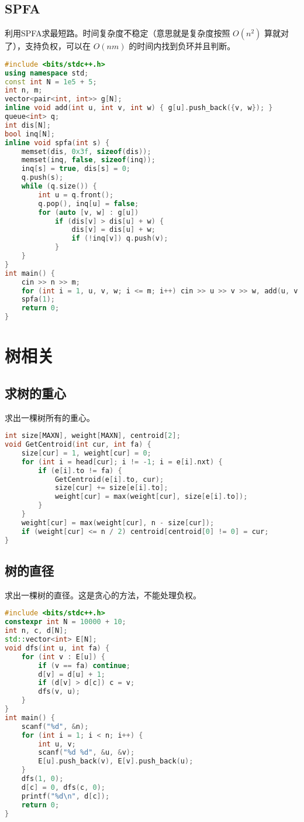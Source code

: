 \documentclass[9pt, a4paper, oneside]{book}
\begin{document}
\subsection{SPFA}
利用SPFA求最短路。时间复杂度不稳定（意思就是复杂度按照 $O(n^2)$ 算就对了），支持负权，可以在 $O(nm)$ 的时间内找到负环并且判断。
\begin{lstlisting}[language={C++}]
#include <bits/stdc++.h>
using namespace std;
const int N = 1e5 + 5;
int n, m;
vector<pair<int, int>> g[N];
inline void add(int u, int v, int w) { g[u].push_back({v, w}); }
queue<int> q;
int dis[N];
bool inq[N];
inline void spfa(int s) {
    memset(dis, 0x3f, sizeof(dis));
    memset(inq, false, sizeof(inq));
    inq[s] = true, dis[s] = 0;
    q.push(s);
    while (q.size()) {
        int u = q.front();
        q.pop(), inq[u] = false;
        for (auto [v, w] : g[u])
            if (dis[v] > dis[u] + w) {
                dis[v] = dis[u] + w;
                if (!inq[v]) q.push(v);
            }
    }
}
int main() {
    cin >> n >> m;
    for (int i = 1, u, v, w; i <= m; i++) cin >> u >> v >> w, add(u, v, w), add(v, u, w);
    spfa(1);
    return 0;
}\end{lstlisting}
\section{树相关}
\subsection{求树的重心}
求出一棵树所有的重心。
\begin{lstlisting}[language={C++}]
int size[MAXN], weight[MAXN], centroid[2];
void GetCentroid(int cur, int fa) {
    size[cur] = 1, weight[cur] = 0;
    for (int i = head[cur]; i != -1; i = e[i].nxt) {
        if (e[i].to != fa) {
            GetCentroid(e[i].to, cur);
            size[cur] += size[e[i].to];
            weight[cur] = max(weight[cur], size[e[i].to]);
        }
    }
    weight[cur] = max(weight[cur], n - size[cur]);
    if (weight[cur] <= n / 2) centroid[centroid[0] != 0] = cur;
}\end{lstlisting}
\subsection{树的直径}
求出一棵树的直径。这是贪心的方法，不能处理负权。
\begin{lstlisting}[language={C++}]
#include <bits/stdc++.h>
constexpr int N = 10000 + 10;
int n, c, d[N];
std::vector<int> E[N];
void dfs(int u, int fa) {
    for (int v : E[u]) {
        if (v == fa) continue;
        d[v] = d[u] + 1;
        if (d[v] > d[c]) c = v;
        dfs(v, u);
    }
}
int main() {
    scanf("%d", &n);
    for (int i = 1; i < n; i++) {
        int u, v;
        scanf("%d %d", &u, &v);
        E[u].push_back(v), E[v].push_back(u);
    }
    dfs(1, 0);
    d[c] = 0, dfs(c, 0);
    printf("%d\n", d[c]);
    return 0;
}\end{lstlisting}
\end{document}
